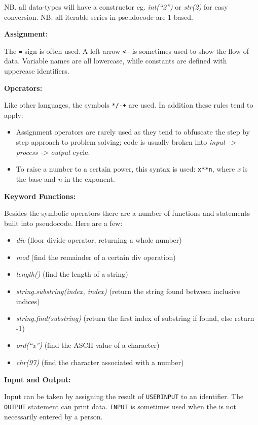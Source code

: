 \documentclass[10pt]{article}
\begin{document}
NB. all data-types will have a constructor eg. \emph{int(``2'')} or \emph{str(2)} for easy conversion.
NB. all iterable series in pseudocode are 1 based.

\textbf{Assignment:}

The \texttt{=} sign is often used. A left arrow \texttt{<-} is sometimes used to show the flow of data. Variable names are all lowercase, while constants are defined with uppercase identifiers.

\textbf{Operators:}

Like other languages, the symbols \texttt{*/-+} are used. In addition these rules tend to apply:

\begin{itemize}
\item Assignment operators are rarely used as they tend to obfuscate the step by step approach to problem solving; code is usually broken into \emph{input -> process -> output} cycle.
\item To raise a number to a certain power, this syntax is used: \texttt{x**n}, where \emph{x} is the base and \emph{n} in the exponent.
\end{itemize}

\textbf{Keyword Functions:}

Besides the symbolic operators there are a number of functions and statements built into pseudocode. Here are a few:

\begin{itemize}
\item \emph{div} (floor divide operator, returning a whole number)
\item \emph{mod} (find the remainder of a certain div operation)
\item \emph{length()} (find the length of a string)
\item \emph{string.substring(index, index)} (return the string found between inclusive indices)
\item \emph{string.find(substring)} (return the first index of substring if found, else return -1)
\item \emph{ord(``x'')} (find the ASCII value of a character)
\item \emph{chr(97)} (find the character associated with a number)
\end{itemize}

\textbf{Input and Output:}

Input can be taken by assigning the result of \texttt{USERINPUT} to an identifier. The \texttt{OUTPUT} statement can print data. \texttt{INPUT} is sometimes used when the is not necessarily entered by a person.
\end{document}

